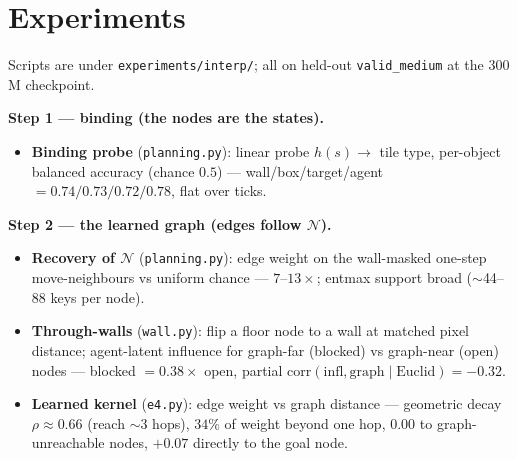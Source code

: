 \documentclass[11pt]{article}
\newcommand{\NN}{\mathcal{N}}
\begin{document}
\section{Experiments}
\vspace{-2pt}
Scripts are under \texttt{experiments/interp/}; all on held-out \texttt{valid\_medium} at the $300$M checkpoint.

\textbf{Step 1 --- binding (the nodes are the states).}
\begin{itemize}[leftmargin=1.4em,itemsep=1pt,topsep=2pt]
\item \textbf{Binding probe} (\texttt{planning.py}): linear probe $h(s)\!\to\!$ tile type,
per-object balanced accuracy (chance $0.5$) --- wall/box/target/agent $=0.74/0.73/0.72/0.78$, flat over ticks.
\end{itemize}

\textbf{Step 2 --- the learned graph (edges follow $\NN$).}
\begin{itemize}[leftmargin=1.4em,itemsep=1pt,topsep=2pt]
\item \textbf{Recovery of $\NN$} (\texttt{planning.py}): edge weight on the wall-masked one-step
move-neighbours vs uniform chance --- $7$--$13\times$; entmax support broad ($\sim$44--88 keys per node).
\item \textbf{Through-walls} (\texttt{wall.py}): flip a floor node to a wall at matched pixel
distance; agent-latent influence for graph-far (blocked) vs graph-near (open) nodes --- blocked
$=0.38\times$ open, partial corr$(\text{infl},\text{graph}\!\mid\!\text{Euclid})=-0.32$.
\item \textbf{Learned kernel} (\texttt{e4.py}): edge weight vs graph distance --- geometric decay
$\rho{\approx}0.66$ (reach $\sim$3 hops), $34\%$ of weight beyond one hop, $0.00$ to graph-unreachable nodes,
$+0.07$ directly to the goal node.
\end{itemize}
\end{document}
